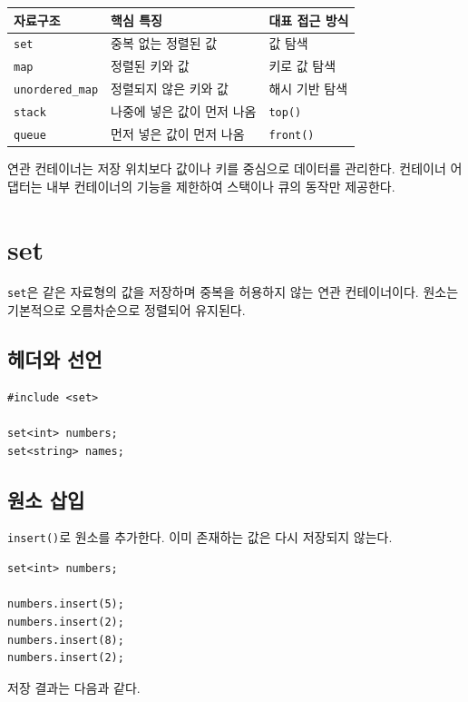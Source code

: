 \documentclass[11pt,a4paper]{article}
\begin{document}
\begin{center}
\begin{tabular}{lll}
\toprule
자료구조 & 핵심 특징 & 대표 접근 방식 \\
\midrule
\texttt{set} & 중복 없는 정렬된 값 & 값 탐색 \\
\texttt{map} & 정렬된 키와 값 & 키로 값 탐색 \\
\texttt{unordered\_map} & 정렬되지 않은 키와 값 & 해시 기반 탐색 \\
\texttt{stack} & 나중에 넣은 값이 먼저 나옴 & \texttt{top()} \\
\texttt{queue} & 먼저 넣은 값이 먼저 나옴 & \texttt{front()} \\
\bottomrule
\end{tabular}
\end{center}

\begin{importantbox}
연관 컨테이너는 저장 위치보다 값이나 키를 중심으로 데이터를 관리한다. 컨테이너 어댑터는 내부 컨테이너의 기능을 제한하여 스택이나 큐의 동작만 제공한다.
\end{importantbox}

\section{set}
\texttt{set}은 같은 자료형의 값을 저장하며 중복을 허용하지 않는 연관 컨테이너이다. 원소는 기본적으로 오름차순으로 정렬되어 유지된다.

\subsection{헤더와 선언}
\begin{lstlisting}
#include <set>

set<int> numbers;
set<string> names;
\end{lstlisting}

\subsection{원소 삽입}
\texttt{insert()}로 원소를 추가한다. 이미 존재하는 값은 다시 저장되지 않는다.

\begin{lstlisting}
set<int> numbers;

numbers.insert(5);
numbers.insert(2);
numbers.insert(8);
numbers.insert(2);
\end{lstlisting}

저장 결과는 다음과 같다.
\end{document}
